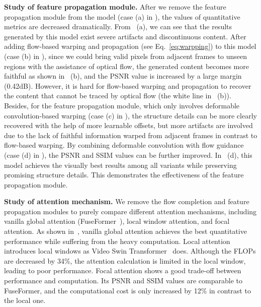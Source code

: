 \documentclass[final]{cvpr}
\newcommand{\subtitle}[1]{\noindent \textbf{#1}}
\begin{document}
\subtitle{Study of feature propagation module.}
After we remove the feature propagation module from the model (case (a) in ), the values of quantitative metrics are decreased dramatically. 
From ~(a), we can see that the results generated by this model exist severe artifacts and discontinuous content.
After adding flow-based warping and propagation (see Eq.~\eqref{eq:warpping}) to this model (case (b) in ), since we could bring valid pixels from adjacent frames to unseen regions with the assistance of optical flow, the generated content becomes more faithful as shown in ~(b), and the PSNR value is increased by a large margin (0.42dB).
However, it is hard for flow-based warping and propagation to recover the content that cannot be traced by optical flow (the white line in ~(b)).
Besides, for the feature propagation module, which only involves deformable convolution-based warping (case (c) in ), the structure details can be more clearly recovered with the help of more learnable offsets, but more artifacts are involved due to the lack of faithful information warped from adjacent frames in contrast to flow-based warping.
By combining deformable convolution with flow guidance (case (d) in ), the PSNR and SSIM values can be further improved.
In ~(d), this model achieves the visually best results among all variants while preserving promising structure details. 
This demonstrates the effectiveness of the feature propagation module.

\subtitle{Study of attention mechanism.}
We remove the flow completion and feature propagation modules to purely compare different attention mechanisms, including vanilla global attention (FuseFormer~\cite{Liu_2021_FuseFormer}), local window attention, and focal attention.
As shown in~, vanilla global attention achieves the best quantitative performance while suffering from the heavy computation. 
Local attention introduces local windows as Video Swin Transformer~\cite{liu2021video} does.
Although the FLOPs are decreased by 34\%, the attention calculation is limited in the local window, leading to poor performance.
Focal attention shows a good trade-off between performance and computation.
Its PSNR and SSIM values are comparable to FuseFormer, and the computational cost is only increased by 12\% in contrast to the local one.
\end{document}

